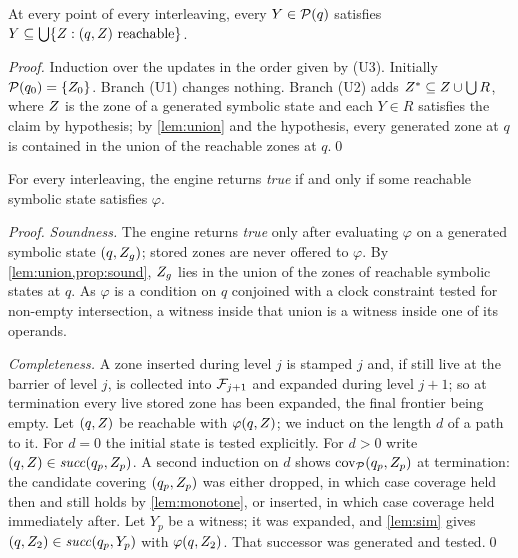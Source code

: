 \begin{proposition}\label{prop:sound}
At every point of every interleaving, every $Y \in \mathcal{P}(q)$ satisfies $Y
\subseteq \bigcup\{Z : (q,Z) \text{ reachable}\}$.
\end{proposition}
\begin{proof}
Induction over the updates in the order given by (U3).  Initially $\mathcal{P}(q_0) =
\{Z_0\}$.  Branch (U1) changes nothing.  Branch (U2) adds $Z^{*}
\subseteq Z \cup \bigcup R$, where $Z$ is the zone of a generated
symbolic state and each $Y \in R$ satisfies the claim by hypothesis; by
\cref{lem:union} and the hypothesis, every generated zone at $q$ is contained in
the union of the reachable zones at $q$.\qed
\end{proof}

\begin{theorem}\label{thm:verdict}
For every interleaving, the engine returns \emph{true} if and only if some
reachable symbolic state satisfies $\varphi$.
\end{theorem}
\begin{proof}
\emph{Soundness.}  The engine returns \emph{true} only after evaluating $\varphi$
on a generated symbolic state $(q,Z_g)$; stored zones are never offered to
$\varphi$.  By \cref{lem:union,prop:sound}, $Z_g$ lies in the union of the
zones of reachable symbolic states at $q$.  As $\varphi$ is a condition on $q$
conjoined with a clock constraint tested for non-empty intersection, a witness
inside that union is a witness inside one of its operands.

\emph{Completeness.}  A zone inserted during level $j$ is stamped $j$ and, if
still live at the barrier of level $j$, is collected into $\mathcal{F}_{j+1}$ and
expanded during level $j+1$; so at termination every live stored zone has been
expanded, the final frontier being empty.  Let $(q,Z)$ be reachable with
$\varphi(q,Z)$; we induct on the length $d$ of a path to it.  For $d = 0$ the
initial state is tested explicitly.  For $d > 0$ write $(q,Z) \in
\mathit{succ}(q_p,Z_p)$.  A second induction on $d$ shows
$\mathrm{cov}_{\mathcal{P}}(q_p,Z_p)$ at termination: the candidate covering
$(q_p,Z_p)$ was either dropped, in which case coverage held then and still
holds by \cref{lem:monotone}, or inserted, in which case coverage held
immediately after.  Let $Y_p$ be a witness; it was expanded, and \cref{lem:sim}
gives $(q,Z_2) \in \mathit{succ}(q_p,Y_p)$ with $\varphi(q,Z_2)$.  That
successor was generated and tested.\qed
\end{proof}

